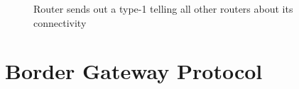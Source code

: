 \begin{figure}
   \centering
   \caption{Router  sends out a type-1  telling all other routers about its connectivity}
   \label{fig:routing-ospf-lsa-1}
\end{figure}

\section{Border Gateway Protocol}
\label{sec:bgp}

